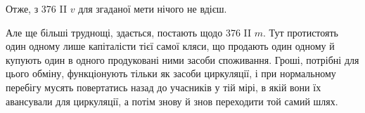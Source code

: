 Отже, з 376 II $v$ для згаданої мети нічого не вдієш.

Але ще більші труднощі, здається, постають щодо 376 II $m$. Тут протистоять
один одному лише капіталісти тієї самої кляси, що продають
один одному й купують один в одного продуковані ними засоби споживання.
Гроші, потрібні для цього обміну, функціонують тільки як засоби
циркуляції, і при нормальному перебігу мусять повертатись назад
до учасників у тій мірі, в якій вони їх авансували для циркуляції, а потім
знову й знов переходити той самий шлях.
